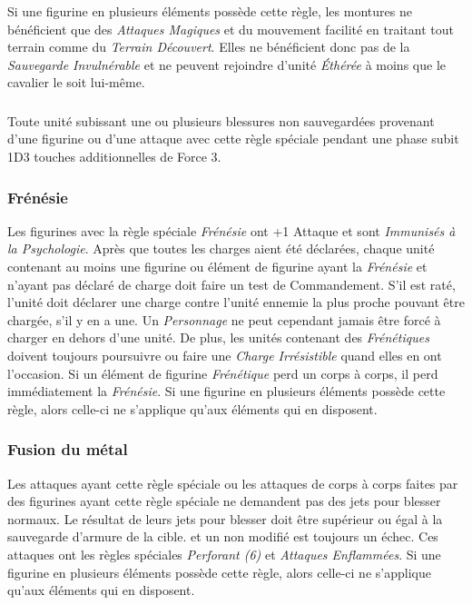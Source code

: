 Si une figurine en plusieurs éléments possède cette règle, les montures ne bénéficient que des \emph{Attaques Magiques} et du mouvement facilité en traitant tout terrain comme du \emph{Terrain Découvert}. Elles ne bénéficient donc pas de la \emph{Sauvegarde Invulnérable} et ne peuvent rejoindre d'unité \emph{Éthérée} à moins que le cavalier le soit lui-même.

\subsubsection*{}

Toute unité subissant une ou plusieurs blessures non sauvegardées provenant d'une figurine ou d'une attaque avec cette règle spéciale pendant une phase subit 1D3 touches additionnelles de Force 3.

\subsubsection*{Frénésie}

Les figurines avec la règle spéciale \emph{Frénésie} ont +1 Attaque et sont \emph{Immunisés à la Psychologie}. Après que toutes les charges aient été déclarées, chaque unité contenant au moins une figurine ou élément de figurine ayant la \emph{Frénésie} et n'ayant pas déclaré de charge doit faire un test de Commandement. S'il est raté, l'unité doit déclarer une charge contre l'unité ennemie la plus proche pouvant être chargée, s'il y en a une. Un \emph{Personnage} ne peut cependant jamais être forcé à charger en dehors d'une unité. De plus, les unités contenant des \emph{Frénétiques} doivent toujours poursuivre ou faire une \emph{Charge Irrésistible} quand elles en ont l'occasion. Si un élément de figurine \emph{Frénétique} perd un corps à corps, il perd immédiatement la \emph{Frénésie}. Si une figurine en plusieurs éléments possède cette règle, alors celle-ci ne s'applique qu'aux éléments qui en disposent.

\subsubsection*{Fusion du métal}

Les attaques ayant cette règle spéciale ou les attaques de corps à corps faites par des figurines ayant cette règle spéciale ne demandent pas des jets pour blesser normaux. Le résultat de leurs jets pour blesser doit être supérieur ou égal à la sauvegarde d'armure de la cible.  et un  non modifié est toujours un échec. Ces attaques ont les règles spéciales \emph{Perforant (6)} et \emph{Attaques Enflammées}. Si une figurine en plusieurs éléments possède cette règle, alors celle-ci ne s'applique qu'aux éléments qui en disposent.

